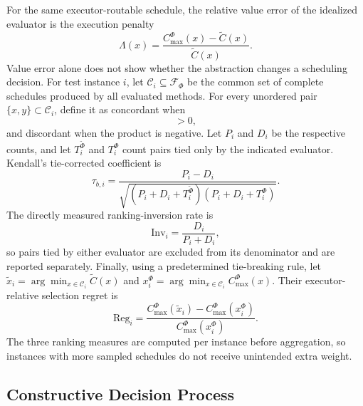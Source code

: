 For the same executor-routable schedule, the relative value error of the
idealized evaluator is the execution penalty
\begin{equation}
 \Lambda(x)=
 \frac{C_{\max}^{\Phi}(x)-\widetilde C(x)}{\widetilde C(x)}.
 \label{eq:penalty}
\end{equation}
Value error alone does not show whether the abstraction changes a scheduling
decision. For test instance $i$, let $\mathcal C_i\subseteq\mathcal F_\Phi$
be the common set of complete schedules produced by all evaluated methods.
For every unordered pair $\{x,y\}\subset\mathcal C_i$, define it as concordant
when
\begin{equation}
 [\widetilde C(x)-\widetilde C(y)]
 [C_{\max}^{\Phi}(x)-C_{\max}^{\Phi}(y)]>0,
 \label{eq:concordant}
\end{equation}
and discordant when the product is negative. Let $P_i$ and $D_i$ be the
respective counts, and let $T_i^{\widetilde\Phi}$ and $T_i^\Phi$ count pairs
tied only by the indicated evaluator. Kendall's tie-corrected coefficient is
\begin{equation}
 \tau_{b,i}=
 \frac{P_i-D_i}
 {\sqrt{(P_i+D_i+T_i^{\widetilde\Phi})
              (P_i+D_i+T_i^\Phi)}}.
 \label{eq:kendall}
\end{equation}
The directly measured ranking-inversion rate is
\begin{equation}
 \mathrm{Inv}_i=\frac{D_i}{P_i+D_i},
 \label{eq:inversion}
\end{equation}
so pairs tied by either evaluator are excluded from its denominator and are
reported separately. Finally, using a predetermined tie-breaking rule, let
$\widetilde x_i=\arg\min_{x\in\mathcal C_i}\widetilde C(x)$ and
$x_i^\Phi=\arg\min_{x\in\mathcal C_i}C_{\max}^{\Phi}(x)$. Their
executor-relative selection regret is
\begin{equation}
 \mathrm{Reg}_i=
 \frac{C_{\max}^{\Phi}(\widetilde x_i)-C_{\max}^{\Phi}(x_i^\Phi)}
 {C_{\max}^{\Phi}(x_i^\Phi)}.
 \label{eq:selection-regret}
\end{equation}
The three ranking measures are computed per instance before aggregation, so
instances with more sampled schedules do not receive unintended extra weight.

\subsection{Constructive Decision Process}
\label{sec:mdp}


